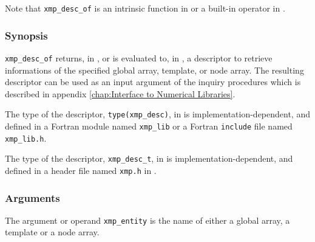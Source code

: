 Note that {\tt xmp\_desc\_of} is an intrinsic function in {\XMPF} or
a built-in operator in {\XMPC}.

\subsubsection*{Synopsis}


{\tt xmp\_desc\_of} returns, in {\XMPF}, or is evaluated to, in {\XMPC},
a descriptor to retrieve informations of the specified global array,
template, or node array. The resulting descriptor can be used as an
input argument of the inquiry procedures which is described in appendix
\ref{chap:Interface to Numerical Libraries}.

The type of the descriptor, {\tt type(xmp\_desc)}, in {\XMPF} 
is implementation-dependent, and defined in
a Fortran module named {\tt xmp\_lib} or a Fortran {\tt include} file
named {\tt xmp\_lib.h}.

The type of the descriptor, {\tt xmp\_desc\_t}, in {\XMPC} is
implementation-dependent, and defined in a header file named {\tt xmp.h}
in {\XMPC}.


\subsubsection*{Arguments}

The argument or operand {\tt xmp\_entity} is the name of either a global
array, a template or a node array.



